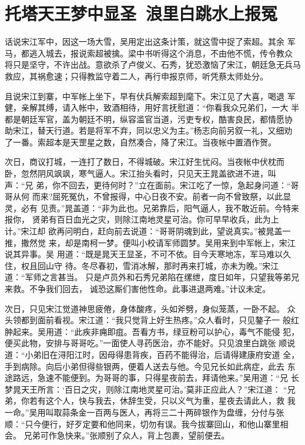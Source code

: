 \chapter{托塔天王梦中显圣~浪里白跳水上报冤}

话说宋江军中，因这一场大雪，吴用定出这条计策，就这雪中捉了索超。其余
军马，都逃入城去，报说索超被擒。梁中书听得这个消息，不由他不慌，传令教众
将只是坚守，不许出战。意欲杀了卢俊义、石秀，犹恐激恼了宋江，朝廷急无兵马
救应，其祸愈速；只得教监守着二人，再行申报京师，听凭蔡太师处分。

且说宋江到寨，中军帐上坐下，早有伏兵解索超到麾下。宋江见了大喜，喝退
军健，亲解其缚，请入帐中，致酒相待，用好言抚慰道：“你看我众兄弟们，一大
半都是朝廷军官，盖为朝廷不明，纵容滥官当道，污吏专权，酷害良民，都情愿协
助宋江，替天行道。若是将军不弃，同以忠义为主。”杨志向前另叙一礼，又细劝
了一番。索超本是天罡星之数，自然凑合，降了宋江。当夜帐中置酒作贺。

次日，商议打城，一连打了数日，不得城破。宋江好生忧闷。当夜帐中伏枕而
卧，忽然阴风飒飒，寒气逼人。宋江抬头看时，只见天王晁盖欲进不进，叫声：“兄
弟，你不回去，更待何时？”立在面前。宋江吃了一惊，急起身问道：“哥哥从何
而来?屈死冤仇，不曾报得，中心日夜不安。前者一向不曾致祭，以此显灵，必有
见责。”晁盖道：“非为此也。兄弟靠后，阳气逼人，我不敢近前。今特来报你，
贤弟有百日血光之灾，则除江南地灵星可治。你可早早收兵，此为上计。”宋江却
欲再问明白，赶向前去说道：“哥哥阴魂到此，望说真实。”被晁盖一推，撒然觉
来，却是南柯一梦。便叫小校请军师圆梦。吴用来到中军帐上，宋江说其异事。吴
用道：“既是晁天王显圣，不可不依。目今天寒地冻，军马难以久住，权且回山守
待。冬尽春初，雪消冰解，那时再来打城，亦未为晚。”宋江道：“军师之言甚当。
只是卢员外和石秀兄弟陷在缧绁，度日如年，只望我等弟兄来救。不争我们回去，
诚恐这厮们害他性命。此事进退两难。”计议未定。

次日，只见宋江觉道神思疲倦，身体酸疼，头如斧劈，身似笼蒸，一卧不起。
众头领都到面前看视。宋江道：“我只觉背上好生热疼。”众人看时，只见鏊子一
般红肿起来。吴用道：“此疾非痈即疽。吾看方书，绿豆粉可以护心，毒气不能侵
犯，便买此物，安排与哥哥吃。”一面使人寻药医治，亦不能好。只见浪里白跳张
顺说道：“小弟旧在浔阳江时，因母得患背疾，百药不能得治，后请得建康府安道
全，手到病除。向后小弟但得些银两，便着人送去与他。今见兄长如此病症，此去
东途路远，急速不能便到。为哥哥的事，只得星夜前去，拜请他来。”吴用道：“兄
长梦晁天王所言：‘百日之灾，则除江南地灵星可治。’莫非正应此人？”宋江道：
“兄弟，你若有这个人，快与我去，休辞生受，只以义气为重，星夜去请此人，救
我一命。”吴用叫取蒜条金一百两与医人，再将三二十两碎银作为盘缠，分付与张
顺：“只今便行，好歹定要和他同来，切勿有误。我今拔寨回山，和他山寨里相会。
兄弟可作急快来。”张顺别了众人，背上包裹，望前便去。


